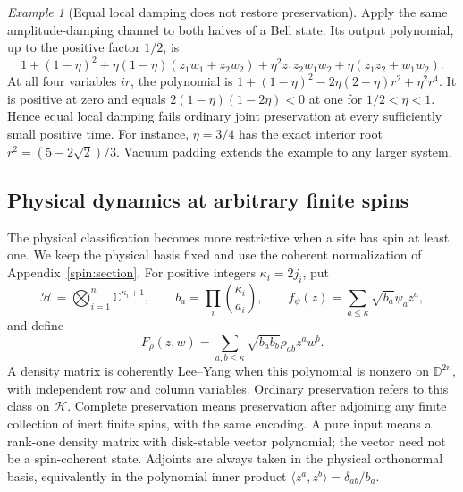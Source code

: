 \documentclass[reqno]{amsart}
\theoremstyle{definition}
\theoremstyle{remark}
\newtheorem{example}[theorem]{Example}
\newcommand{\C}{\mathbb C}
\newcommand{\D}{\mathbb D}
\begin{document}
\begin{example}[Equal local damping does not restore preservation]\label{dyn:equal-damping}
Apply the same amplitude-damping channel to both halves of a Bell state.
Its output polynomial, up to the positive factor $1/2$, is
\[
 1+(1-\eta)^2+\eta(1-\eta)(z_1w_1+z_2w_2)
 +\eta^2z_1z_2w_1w_2+\eta(z_1z_2+w_1w_2).
\]
At all four variables $ir$, the polynomial is
$1+(1-\eta)^2-2\eta(2-\eta)r^2+\eta^2r^4$.
It is positive at zero and equals $2(1-\eta)(1-2\eta)<0$ at one for
$1/2<\eta<1$.  Hence equal local damping fails ordinary joint
preservation at every sufficiently small positive time.  For instance,
$\eta=3/4$ has the exact interior root
$r^2=(5-2\sqrt2)/3$.  Vacuum padding extends the example to any larger
system.
\end{example}


\subsection{Physical dynamics at arbitrary finite spins}
\label{dynspin:subsection}

The physical classification becomes more restrictive when a site has spin
at least one.  We keep the physical basis fixed and use the coherent
normalization of Appendix~\ref{spin:section}.  For positive integers
$\kappa_i=2j_i$, put
\[
 \mathcal H=\bigotimes_{i=1}^n\C^{\kappa_i+1},\qquad
 b_a=\prod_i\binom{\kappa_i}{a_i},\qquad
 f_\psi(z)=\sum_{a\leq\kappa}\sqrt{b_a}\psi_a z^a,
\]
and define
\begin{equation}\label{dynspin:kernel}
 F_\rho(z,w)=\sum_{a,b\leq\kappa}\sqrt{b_ab_b}\rho_{ab}z^aw^b.
\end{equation}
A density matrix is coherently Lee--Yang when this polynomial is nonzero
on $\D^{2n}$, with independent row and column variables.  Ordinary
preservation refers to this class on $\mathcal H$.  Complete preservation
means preservation after adjoining any finite collection of inert finite
spins, with the same encoding.  A pure input means a rank-one density
matrix with disk-stable vector polynomial; the vector need not be a
spin-coherent state.  Adjoints are always taken in the physical
orthonormal basis, equivalently in the polynomial inner product
$\langle z^a,z^b\rangle=\delta_{ab}/b_a$.
\end{document}
